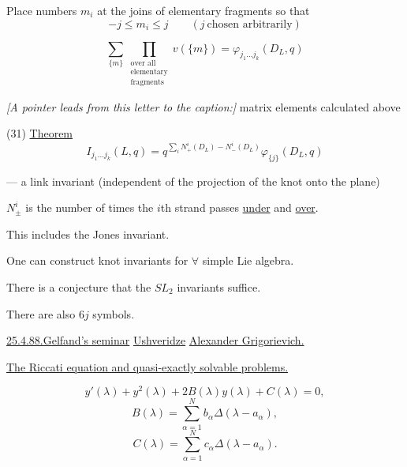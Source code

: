 Place numbers $m_i$ at the joins of elementary fragments so that
\begin{equation*}
-j\leq m_i\leq j \qquad (j\ \text{chosen arbitrarily})
\end{equation*}

\begin{equation*}
\sum_{\{m\}}\prod_{\substack{\text{over all}\\\text{elementary}\\\text{fragments}}}
v(\{m\})=\varphi_{j_1\ldots j_k}(D_L,q)
\tag{30}
\end{equation*}

\textit{[A pointer leads from this letter to the caption:]} matrix elements calculated above

(31) \underline{Theorem}
\begin{equation*}
I_{j_1\ldots j_k}(L,q)
=q^{\sum_i N_+^i(D_L)-N_-^i(D_L)}\varphi_{\{j\}}(D_L,q)
\end{equation*}

--- a link invariant (independent of the projection of the knot onto the plane)

$N_\pm^i$ is the number of times the $i$th strand passes \underline{under} and \underline{over}.

This includes the Jones invariant.

One can  construct knot invariants for $\forall$ simple Lie algebra.

There is a conjecture that the $SL_2$ invariants suffice.

There are also $6j$ symbols.

\underline{25.4.88.}\quad\underline{Gelfand's seminar}
\qquad
\underline{Ushveridze}
\underline{Alexander Grigorievich.}

\underline{The Riccati equation and quasi-exactly solvable problems.}

\begin{equation*}
y'(\lambda)+y^2(\lambda)+2B(\lambda)y(\lambda)+C(\lambda)=0,
\tag{1}
\end{equation*}
\begin{equation*}
B(\lambda)=\sum_{\alpha=1}^N b_\alpha\Delta(\lambda-a_\alpha),
\tag{2}
\end{equation*}
\begin{equation*}
C(\lambda)=\sum_{\alpha=1}^N c_\alpha\Delta(\lambda-a_\alpha).
\tag{3}
\end{equation*}

